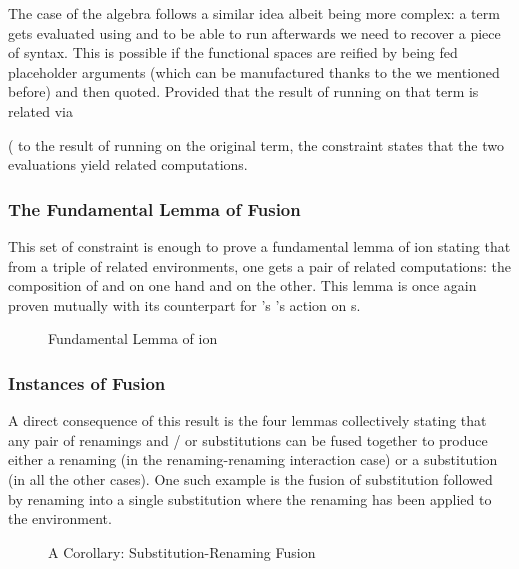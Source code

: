 The case of the algebra follows a similar idea albeit being more complex:
a term gets evaluated using  and to be able to run 
afterwards we need to recover a piece of syntax. This is possible if the
 functional spaces are reified by being fed placeholder  arguments
(which can be manufactured thanks to the  we mentioned before) and
then quoted. Provided that the result of running  on that term is
related via {   (   to the result
of running  on the original term, the  constraint states
that the two evaluations yield related computations.


\subsubsection{The Fundamental Lemma of Fusion}

This set of constraint is enough to prove a fundamental lemma of ion
stating that from a triple of related environments, one gets a pair of related
computations: the composition of  and  on one hand and
 on the other. This lemma is once again proven mutually with its
counterpart for \semrec{}'s 's action on s.

\begin{figure}[h]
\caption{Fundamental Lemma of ion}
\end{figure}

\subsubsection{Instances of Fusion}

A direct consequence of this result is the four lemmas collectively stating
that any pair of renamings and / or substitutions can be fused together to
produce either a renaming (in the renaming-renaming interaction case) or a
substitution (in all the other cases). One such example is the fusion of
substitution followed by renaming into a single substitution where the
renaming has been applied to the environment.

\begin{figure}[h]
\caption{A Corollary: Substitution-Renaming Fusion}
\end{figure}

}
